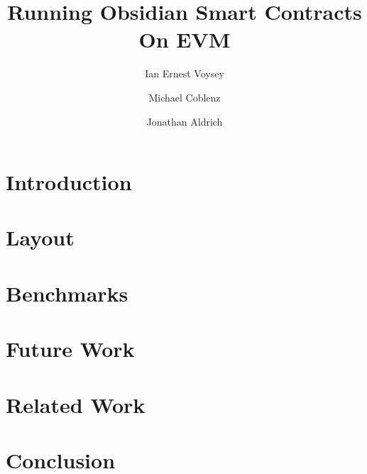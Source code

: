\documentclass[sigplan,review,screen]{acmart}
\begin{document}
\title{Running Obsidian Smart Contracts On EVM}

\author{Ian Ernest Voysey}
\cmu{}

\author{Michael Coblenz}

\author{Jonathan Aldrich}
\cmu{}

\maketitle

\section{Introduction}\label{sec:intro}


\section{Layout}\label{sec:layout}


\section{Benchmarks}\label{sec:benchmarks}


\section{Future Work}\label{sec:futurework}


\section{Related Work}\label{sec:relatedwork}


\section{Conclusion}\label{sec:conclusion}

\end{document}
